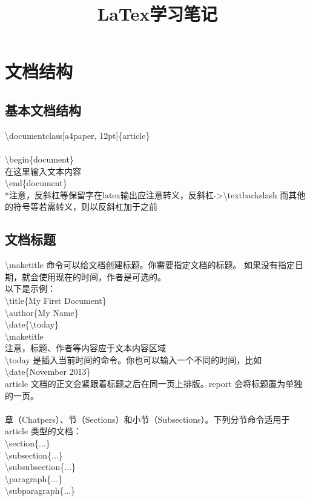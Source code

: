 \documentclass{article}
\begin{document}
	\title{LaTex学习笔记}
	\maketitle
	\section{文档结构}
	\subsection{基本文档结构}
	\textbackslash documentclass[a4paper, 12pt]\{article\}
	\\
\label{ref1}
	\\
	\textbackslash begin\{document\}\\
	  在这里输入文本内容\\
	\textbackslash end\{document\}\\
	
	*注意，反斜杠等保留字在latex输出应注意转义，反斜杠->\textbackslash textbackslash
	而其他的符号等若需转义，则以反斜杠加于之前
	
	\subsection{文档标题}
	\textbackslash maketitle 命令可以给文档创建标题。你需要指定文档的标题。
	如果没有指定日期，就会使用现在的时间，作者是可选的。\\
	以下是示例：\\
	\textbackslash title\{My First Document\}\\
	\textbackslash author\{My Name\}\\
	\textbackslash date\{\textbackslash today\}\\
	\textbackslash maketitle\\
	 注意，标题、作者等内容应于文本内容区域\\
\textbackslash today 是插入当前时间的命令。你也可以输入一个不同的时间，比如 \textbackslash date\{November 2013\}\\
article 文档的正文会紧跟着标题之后在同一页上排版。report 会将标题置为单独的一页。\\
\\
章（Chatpers）、节（Sections）和小节（Subsections）。下列分节命令适用于 article 类型的文档：\\
\textbackslash section\{...\}\\
\textbackslash subsection\{...\}\\
\textbackslash subsubsection\{...\}\\
\textbackslash paragraph\{...\}\\
\textbackslash subparagraph\{...\}\\
\end{document}
